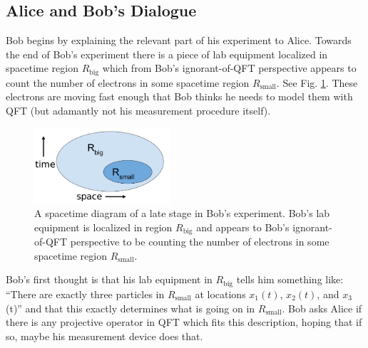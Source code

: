 \documentclass[prd,twocolumn,superscriptaddress,floatfix,amsmath,amssymb,amsfonts,nofootinbib]{revtex4-2}
\begin{document}



\subsection{Alice and Bob's Dialogue}
Bob begins by explaining the relevant part of his experiment to Alice. Towards the end of Bob's experiment there is a piece of lab equipment localized in spacetime region $R_\text{big}$ which from Bob's ignorant-of-QFT perspective appears to count the number of electrons in some spacetime region $R_\text{small}$. See Fig. \ref{FigBigSmall}. These electrons are moving fast enough that Bob thinks he needs to model them with QFT (but adamantly not his measurement procedure itself).

\begin{figure}
\includegraphics[width=0.45\textwidth]{Figures/FigBigSmall.pdf}
\caption{A spacetime diagram of a late stage in Bob's experiment. Bob's lab equipment is localized in region $R_\text{big}$ and appears to Bob's ignorant-of-QFT perspective to be counting the number of electrons in some spacetime region $R_\text{small}$. }\label{FigBigSmall}
\end{figure}

Bob's first thought is that his lab equipment in $R_\text{big}$ tells him something like: ``There are exactly three particles in $R_\text{small}$ at locations $x_1(t)$, $x_2(t)$, and $x_3$(t)'' and that this exactly determines what is going on in $R_\text{small}$. Bob asks Alice if there is any projective operator in QFT which fits this description, hoping that if so, maybe his measurement device does that.
 
\end{document}
